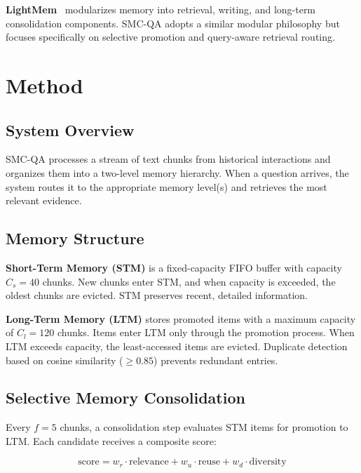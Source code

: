 \documentclass{article}
\begin{document}
\textbf{LightMem}~\cite{lightmem} modularizes memory into retrieval, writing, and long-term consolidation components. SMC-QA adopts a similar modular philosophy but focuses specifically on selective promotion and query-aware retrieval routing.

\section{Method}

\subsection{System Overview}

SMC-QA processes a stream of text chunks from historical interactions and organizes them into a two-level memory hierarchy. When a question arrives, the system routes it to the appropriate memory level(s) and retrieves the most relevant evidence.

\subsection{Memory Structure}

\textbf{Short-Term Memory (STM)} is a fixed-capacity FIFO buffer with capacity $C_s = 40$ chunks. New chunks enter STM, and when capacity is exceeded, the oldest chunks are evicted. STM preserves recent, detailed information.

\textbf{Long-Term Memory (LTM)} stores promoted items with a maximum capacity of $C_l = 120$ chunks. Items enter LTM only through the promotion process. When LTM exceeds capacity, the least-accessed items are evicted. Duplicate detection based on cosine similarity ($\geq 0.85$) prevents redundant entries.

\subsection{Selective Memory Consolidation}

Every $f = 5$ chunks, a consolidation step evaluates STM items for promotion to LTM. Each candidate receives a composite score:

\begin{equation}
    \text{score} = w_r \cdot \text{relevance} + w_u \cdot \text{reuse} + w_d \cdot \text{diversity}
\end{equation}
\end{document}
